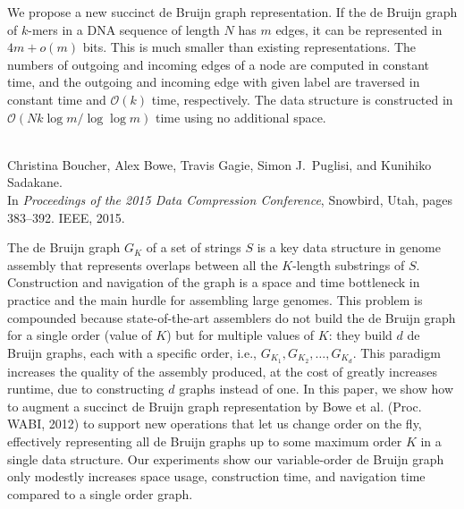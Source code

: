 \documentclass[a4paper,11pt]{article}
\newcommand\mypaper[2]{{\bigskip\noindent{\bf#1}\\\small#2\par\medskip}} %
\newcommand{\Order}{\mathcal{O}}
\newcommand{\order}{o}
\begin{document}
\noindent
We propose a new succinct de Bruijn graph representation.  
If the de Bruijn graph of $k$-mers in a DNA sequence of length $N$ has $m$ edges,
it can be represented in $4m + \order(m)$ bits.
This is much smaller than existing representations.
The numbers of outgoing and incoming edges of a node are computed in constant time, and
the outgoing and incoming edge with given label are traversed in constant time
and $\Order(k)$ time, respectively.
The data structure is constructed in $\Order(Nk \log m/\log\log m)$
time using no additional space.

\medskip
\mypaper{Paper II: Variable-Order de Bruijn Graphs}
{Christina Boucher, Alex Bowe, Travis Gagie, Simon J.~Puglisi, and Kunihiko Sadakane.\\
In \textit{Proceedings of the 2015 Data Compression Conference}, Snowbird, Utah, pages 383--392. IEEE, 2015.}

\noindent
The de Bruijn graph $G_K$ of a set of strings $S$ is a key data structure in 
genome assembly that represents overlaps between all the $K$-length substrings 
of $S$. Construction and navigation of the graph is a space and time bottleneck 
in practice and the main hurdle for assembling large genomes. 
This problem is compounded because state-of-the-art assemblers do not build the de Bruijn graph for a single order (value of $K$) but for multiple values of $K$: they build $d$ de Bruijn graphs, each with a specific order, i.e., $G_{K_1}, G_{K_2}, \ldots, G_{K_d}$.  
This paradigm increases the quality of the assembly produced, at the cost of greatly increases runtime, due to constructing $d$ graphs instead of one.
In this paper, we show how to augment a succinct de Bruijn graph 
representation by Bowe et al. (Proc. WABI, 2012) 
to support new operations that let us change order on the fly, effectively
representing all de Bruijn graphs up to some maximum order $K$ in
a single data structure. 
Our experiments show our variable-order de Bruijn graph only modestly increases
space usage, construction time, and navigation time compared to a single order graph.
\end{document}
